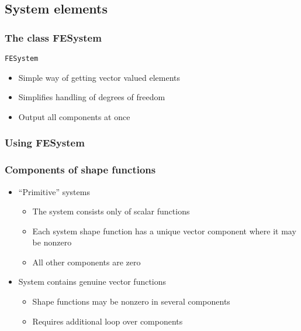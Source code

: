 \subsection{System elements}
\begin{frame}
  \frametitle{The class FESystem}
  \begin{block}{\lstinline!FESystem!}
  \begin{itemize}
  \item Simple way of getting vector valued elements
  \item Simplifies handling of degrees of freedom
  \item Output all components at once
  \end{itemize}
  \end{block}
\end{frame}

\begin{frame}
  \frametitle{Using FESystem}
  \begin{block}{}
    
  \end{block}
\end{frame}

\begin{frame}
  \frametitle{Components of shape functions}
  \begin{itemize}
  \item ``Primitive'' systems
    \begin{itemize}
    \item The system consists only of scalar functions
    \item Each system shape function has a unique vector component
      where it may be nonzero
      \begin{block}{}
        
      \end{block}
    \item All other components are zero
    \end{itemize}
  \item System contains genuine vector functions
    \begin{itemize}
    \item Shape functions may be nonzero in several components
      \begin{block}{}
        
      \end{block}
    \item Requires additional loop over components
    \end{itemize}
  \end{itemize}
\end{frame}

